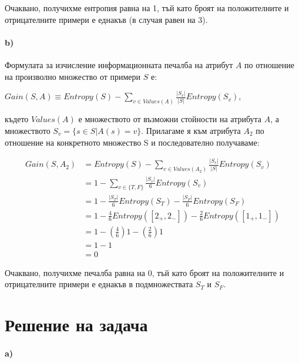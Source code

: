 \documentclass[12pt]{article}
\begin{document}
	Очаквано, получихме ентропия равна на 1, тъй като броят на положителните и отрицателните примери е еднакъв (в случая равен на 3).\newline
	\newpage
	\paragraph{b)}
	Формулата за изчисление информационната печалба на атрибут $A$ по отношение на произволно множество от примери $S$ е:
	
	\begin{center}
		$Gain(S, A) \equiv Entropy(S) - \displaystyle\sum_{v \in Values(A)} \frac{|S_{v}|}{|S|}Entropy(S_{v})$,
	\end{center}
	където $Values(A)$ е множеството от възможни стойности на атрибута $A$, а множеството $S_{v} = \{ s \in S | A(s) = v \}$.\newline\newline
	Прилагаме я към атрибута $A_{2}$ по отношение на конкретното множество S и последователно получаваме:
	
	\begin{equation*}
		\begin{split}
			Gain(S, A_{2}) & = Entropy(S) - \displaystyle\sum_{v \in Values(A_{2})} \frac{|S_{v}|}{|S|}Entropy(S_{v}) \\
			& = 1 - \displaystyle\sum_{v \in \{T, F\}} \frac{|S_{v}|}{6}Entropy(S_{v}) \\
			& = 1 - \frac{|S_{T}|}{6}Entropy(S_{T}) - \frac{|S_{F}|}{6}Entropy(S_{F}) \\
			& = 1 - \frac{4}{6}Entropy([2_{+}, 2_{-}]) - \frac{2}{6}Entropy([1_{+}, 1_{-}]) \\
			& = 1 - (\frac{4}{6})1 - (\frac{2}{6})1 \\
			& = 1 - 1 \\
			& = 0
		\end{split}
	\end{equation*}

	Очаквано, получихме печалба равна на 0, тъй като броят на положителните и отрицателните примери е еднакъв в подмножествата $S_{T}$ и $S_{F}$.\newline
	\newpage
	
	\section{Решение на задача }
	\paragraph{a)}
	
\end{document}
